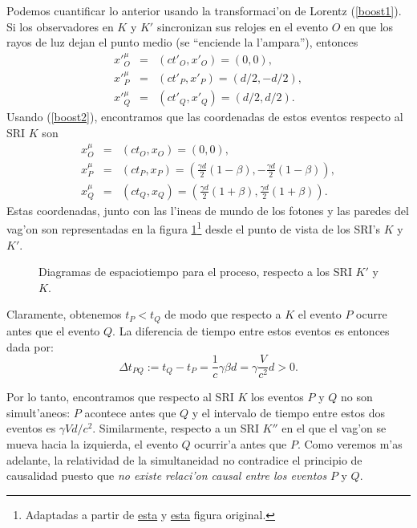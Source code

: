 Podemos cuantificar lo anterior usando la transformaci'on de Lorentz (\ref{boost1}). Si los observadores en $K$ y $K'$ sincronizan sus relojes en el evento $O$ en que los rayos de luz dejan el punto medio (se ``enciende la l'ampara''), entonces
\begin{eqnarray}
x'^\mu_O&=&(ct'_O,x'_O)=(0,0), \\
x'^\mu_P&=&(ct'_P,x'_P)=(d/2,-d/2), \\
x'^\mu_Q&=&(ct'_Q,x'_Q)=(d/2,d/2).
\end{eqnarray}
Usando (\ref{boost2}), encontramos que las coordenadas de estos eventos respecto al SRI $K$ son
\begin{eqnarray}
x^\mu_O&=&(ct_O,x_O)=(0,0), \\
x^\mu_P&=&(ct_P,x_P)=\left(\frac{\gamma d}{2}(1-\beta),-\frac{\gamma d}{2} (1-\beta)\right), \\
x^\mu_Q&=&(ct_Q,x_Q)=\left(\frac{\gamma d}{2}(1+\beta),\frac{\gamma d}{2} (1+\beta)\right).
\end{eqnarray}
Estas coordenadas, junto con las l'ineas de mundo de los fotones y las paredes del vag'on son representadas en la figura \ref{sim03-04}\footnote{Adaptadas a partir de \href{http://commons.wikimedia.org/wiki/File:TrainAndPlatformDiagram1.svg}{esta} y \href{http://commons.wikimedia.org/wiki/File:TrainAndPlatformDiagram2.svg}{esta} figura original.} desde el punto de vista de los SRI's $K$ y $K'$.
\begin{figure}[!h]
\centerline{\hspace{1cm}}
\caption{Diagramas de espaciotiempo para el proceso, respecto a los SRI $K'$ y $K$.}
\label{sim03-04}
\end{figure}

Claramente, obtenemos $t_P<t_Q$ de modo que respecto a $K$ el evento $P$ ocurre antes que el evento $Q$. La diferencia de tiempo entre estos eventos es entonces dada por:
\begin{equation}
 \Delta t_{PQ}:=t_Q-t_P=\frac{1}{c}\gamma \beta d=\gamma\frac{V}{c^2}d >0.
\end{equation}


Por lo tanto, encontramos que respecto al SRI $K$ los eventos $P$ y $Q$ no son simult'aneos: $P$ acontece antes que $Q$ y el intervalo de tiempo entre estos dos eventos es $\gamma{V}d/{c^2}$. Similarmente, respecto a un SRI $K''$ en el que el vag'on se mueva hacia la izquierda, el evento $Q$ ocurrir'a antes que $P$. Como veremos m'as adelante, la relatividad de la simultaneidad no contradice el principio de causalidad puesto que \textit{no existe relaci'on causal entre los eventos} $P$ y $Q$.


